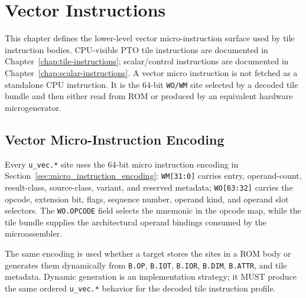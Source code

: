 \chapter{Vector Instructions}
\label{chap:vector-instructions}
This chapter defines the lower-level vector micro-instruction surface used by tile instruction bodies. CPU-visible PTO tile instructions are documented in Chapter~\ref{chap:tile-instructions}; scalar/control instructions are documented in Chapter~\ref{chap:scalar-instructions}. A vector micro instruction is not fetched as a standalone CPU instruction. It is the 64-bit \texttt{WO/WM} site selected by a decoded tile bundle and then either read from ROM or produced by an equivalent hardware microgenerator.

\section{Vector Micro-Instruction Encoding}
Every \texttt{u\_vec.*} site uses the 64-bit micro instruction encoding in Section~\ref{sec:micro_instruction_encoding}: \texttt{WM[31:0]} carries entry, operand-count, result-class, source-class, variant, and reserved metadata; \texttt{WO[63:32]} carries the opcode, extension bit, flags, sequence number, operand kind, and operand slot selectors. The \texttt{WO.OPCODE} field selects the mnemonic in the opcode map, while the tile bundle supplies the architectural operand bindings consumed by the microassembler.

The same encoding is used whether a target stores the sites in a ROM body or generates them dynamically from \texttt{B.OP}, \texttt{B.IOT}, \texttt{B.IOR}, \texttt{B.DIM}, \texttt{B.ATTR}, and tile metadata. Dynamic generation is an implementation strategy; it MUST produce the same ordered \texttt{u\_vec.*} behavior for the decoded tile instruction profile.

